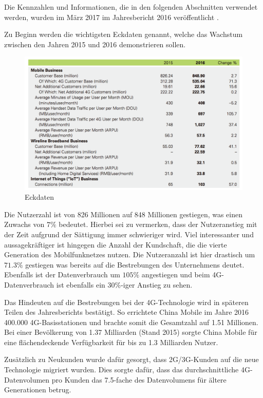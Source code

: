 Die Kennzahlen und Informationen, die in den folgenden Abschnitten verwendet werden, wurden im März 2017 im Jahresbericht 2016 veröffentlicht \cite{chinareport}. 

Zu Beginn werden die wichtigsten Eckdaten genannt, welche das Wachstum zwischen den Jahren 2015 und 2016 demonstrieren sollen. 

\begin{figure}[H]
\centering
\includegraphics[width=\textwidth]{pictures/china_users}
\caption{Eckdaten \cite{chinareport}}
\label{fig:lteplus}
\end{figure}

Die Nutzerzahl ist von 826 Millionen auf 848 Millionen gestiegen, was einen Zuwachs von $7\%$ bedeutet. Hierbei sei zu vermerken, dass der Nutzeranstieg mit der Zeit aufgrund der Sättigung immer schwieriger wird. Viel interessanter und aussagekräftiger ist hingegen die Anzahl der Kundschaft, die die vierte Generation des Mobilfunknetzes nutzen. Die Nutzeranzahl ist hier drastisch um $71.3\%$ gestiegen was bereits auf die Bestrebungen des Unternehmens deutet. Ebenfalls ist der Datenverbrauch um $105\%$ angestiegen und beim 4G-Datenverbrauch ist ebenfalls ein $30\%$-iger Anstieg zu sehen.

Das Hindeuten auf die Bestrebungen bei der 4G-Technologie wird in späteren Teilen des Jahresberichts bestätigt. So errichtete China Mobile im Jahre 2016 400.000 4G-Basisstationen und brachte somit die Gesamtzahl auf 1.51 Millionen. Bei einer Bevölkerung von 1.37 Milliarden (Stand 2015) sorgte China Mobile für eine flächendeckende Verfügbarkeit für bis zu 1.3 Milliarden Nutzer. 

Zusätzlich zu Neukunden wurde dafür gesorgt, dass 2G/3G-Kunden auf die neue Technologie migriert wurden. Dies sorgte dafür, dass das durchschnittliche 4G-Datenvolumen pro Kunden das 7.5-fache des Datenvolumens für ältere Generationen betrug.

